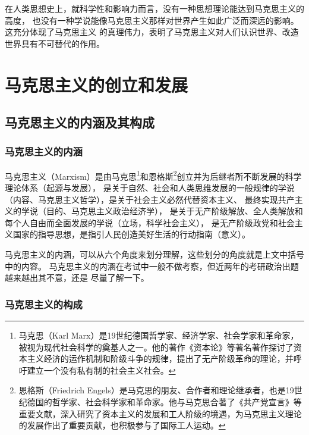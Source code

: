 \documentclass[10pt, UTF8]{book} %
\begin{document}
在人类思想史上，就科学性和影响力而言，没有一种思想理论能达到马克思主义的高度，
也没有一种学说能像马克思主义那样对世界产生如此广泛而深远的影响。这充分体现了马克思主义
的真理伟力，表明了马克思主义对人们认识世界、改造世界具有不可替代的作用。

\section{马克思主义的创立和发展}

\subsection{马克思主义的内涵及其构成}

\subsubsection{马克思主义的内涵}

马克思主义（Marxism）是由马克思\footnote{
    马克思（Karl Marx）是19世纪德国哲学家、经济学家、社会学家和革命家，被视为现代社会科学的奠基人之一。他的著作《资本论》等著名著作探讨了资本主义经济的运作机制和阶级斗争的规律，提出了无产阶级革命的理论，并呼吁建立一个没有私有制的社会主义社会。
}和恩格斯\footnote{
    恩格斯（Friedrich Engels）是马克思的朋友、合作者和理论继承者，也是19世纪德国的哲学家、社会科学家和革命家。他与马克思合著了《共产党宣言》等重要文献，深入研究了资本主义的发展和工人阶级的境遇，为马克思主义理论的发展作出了重要贡献，也积极参与了国际工人运动。
}创立并为后继者所不断发展的科学理论体系（起源与发展），
是关于自然、社会和人类思维发展的一般规律的学说（内容、马克思主义哲学），是关于社会主义必然代替资本主义、
最终实现共产主义的学说（目的、马克思主义政治经济学），
是关于无产阶级解放、全人类解放和每个人自由而全面发展的学说（立场，科学社会主义），
是无产阶级政党和社会主义国家的指导思想，是指引人民创造美好生活的行动指南（意义）。
\begin{remark}
    马克思主义的内涵，可以从六个角度来划分理解，这些划分的角度就是上文中括号中的内容。
    马克思主义的内涵在考试中一般不做考察，但近两年的考研政治出题越来越出其不意，还是
    尽量了解一下。
\end{remark}

\subsubsection{马克思主义的构成}
\end{document}
